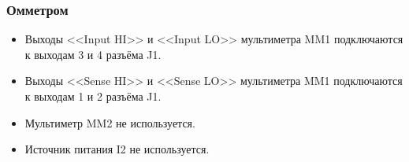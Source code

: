 \subsubsection{Омметром}

    \begin{itemize}
        \item Выходы <<Input HI>> и <<Input LO>> мультиметра MM1 подключаются к выходам 3 и 4 разъёма J1. 
        \item Выходы <<Sense HI>> и <<Sense LO>> мультиметра MM1 подключаются к выходам 1 и 2 разъёма J1. 
        \item Мультиметр MM2 не используется. 
        \item Источник питания I2 не используется. 
    \end{itemize}

